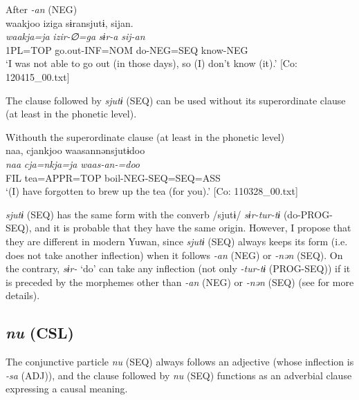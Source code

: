 \ea\label{ex:10.35}   After \textit{{}-an} (NEG)\\
      \glll    waakjoo  iziga  sɨransjutɨ,  sijan.\\
    \textit{waakja=ja}  \textit{izir-∅=ga}  \textit{sɨr-a}  \textit{sij-an}\\
    1PL=TOP  go.out-INF=NOM  do-NEG=SEQ  know-NEG\\
\glt     ‘I was not able to go out (in those days), so (I) don’t know (it).’  [Co: 120415\_00.txt]
\z

  The clause followed by \textit{sjutɨ} (SEQ) can be used without its superordinate clause (at least in the phonetic level).

\ea\label{ex:10.36}   Withouth the superordinate clause (at least in the phonetic level)\\
      \glll    naa,  cjankjoo  waasannənsjutɨdoo\\
    \textit{naa}  \textit{cja=nkja=ja}  \textit{waas-an-=doo}\\
    FIL  tea=APPR=TOP  boil-NEG-SEQ=SEQ=ASS\\
\glt     ‘(I) have forgotten to brew up the tea (for you).’  [Co: 110328\_00.txt]
\z

  \textit{sjutɨ} (SEQ) has the same form with the converb /sjutɨ/ \textit{sɨr-tur-tɨ} (do-PROG-SEQ), and it is probable that they have the same origin. However, I propose that they are different in modern Yuwan, since \textit{sjutɨ} (SEQ) always keeps its form (i.e. does not take another inflection) when it follows \textit{{}-an} (NEG) or \textit{{}-nən} (SEQ). On the contrary, \textit{sɨr-} ‘do’ can take any inflection (not only \textit{{}-tur-tɨ} (PROG-SEQ)) if it is preceded by the morphemes other than \textit{{}-an} (NEG) or \textit{{}-nən} (SEQ) (see  for more details).

\subsection{\textit{nu} (CSL)}\label{sec:10.2.5}

The conjunctive particle \textit{nu} (SEQ) always follows an adjective (whose inflection is \textit{{}-sa} (ADJ)), and the clause followed by \textit{nu} (SEQ) functions as an adverbial clause expressing a causal meaning.

